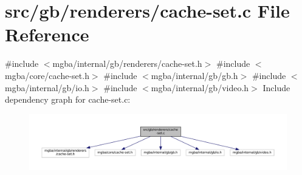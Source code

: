 \hypertarget{gb_2renderers_2cache-set_8c}{}\section{src/gb/renderers/cache-\/set.c File Reference}
\label{gb_2renderers_2cache-set_8c}
{\ttfamily \#include $<$mgba/internal/gb/renderers/cache-\/set.\+h$>$}\newline
{\ttfamily \#include $<$mgba/core/cache-\/set.\+h$>$}\newline
{\ttfamily \#include $<$mgba/internal/gb/gb.\+h$>$}\newline
{\ttfamily \#include $<$mgba/internal/gb/io.\+h$>$}\newline
{\ttfamily \#include $<$mgba/internal/gb/video.\+h$>$}\newline
Include dependency graph for cache-\/set.c\+:
\nopagebreak
\begin{figure}[H]
\begin{center}
\leavevmode
\includegraphics[width=350pt]{gb_2renderers_2cache-set_8c__incl}
\end{center}
\end{figure}

